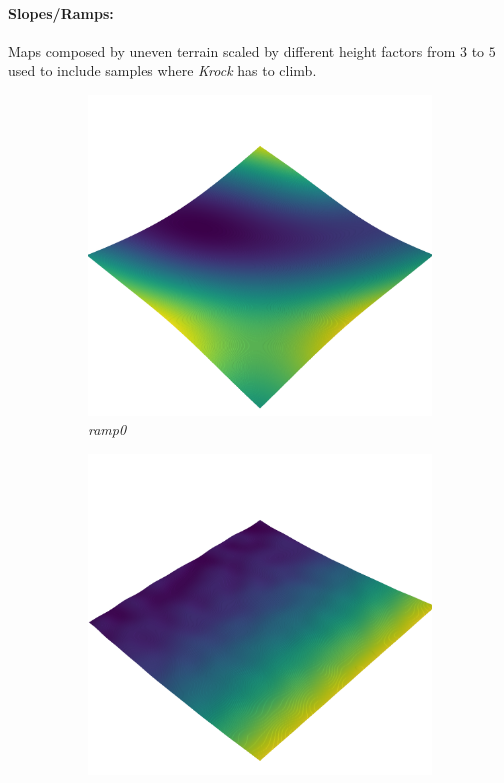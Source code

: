 \documentclass[../document.tex]{subfiles}
\begin{document}
\paragraph{Slopes/Ramps:} Maps composed by uneven terrain scaled by different height factors from $3$ to $5$ used to include samples where \emph{Krock} has to climb.
\begin{figure}[H]
    \centering
        \begin{subfigure}[b]{0.32\textwidth}
            \includegraphics[width=\textwidth]{../img/hm3d/ramp0.png}
            \caption{\emph{ramp0}}
        \end{subfigure}
        \begin{subfigure}[b]{0.32\linewidth}
            \includegraphics[width=\textwidth]{../img/hm3d/ramp1.png}

\end{subfigure}
\end{figure}
\end{document}
